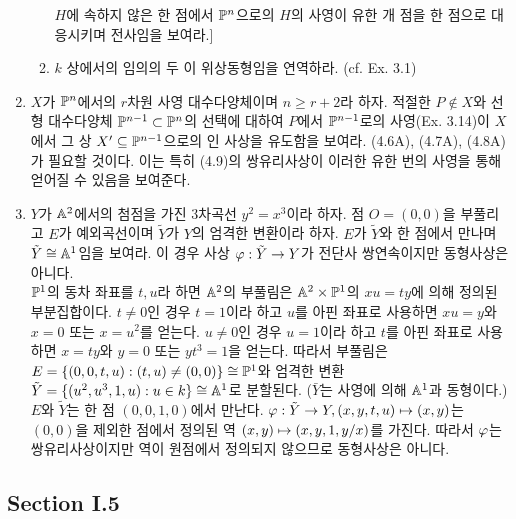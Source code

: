\begin{enumerate}[label=\tb{4.\arabic*.},itemindent=0mm,itemsep=4mm]
\begin{enumerate}[label=(\alph*)]
	$H$에 속하지 않은 한 점에서 $\mathbb{P}^n$으로의 $H$의 사영이 유한 개 점을 한 점으로 대응시키며 전사임을 보여라.]
	\item $k$ 상에서의 임의의 두 이 위상동형임을 연역하라. (cf. Ex. 3.1)
	\end{enumerate}
	\item $X$가 $\mathbb{P}^n$에서의 $r$차원 사영 대수다양체이며 $n\ge r+2$라 하자.
	적절한 $P\notin X$와 선형 대수다양체 $\mathbb{P}^{n-1}\subset\mathbb{P}^n$의 선택에 대하여 $P$에서 $\mathbb{P}^{n-1}$로의 사영(Ex. 3.14)이
	$X$에서 그 상 $X'\subseteq\mathbb{P}^{n-1}$으로의 인 사상을 유도함을 보여라.
	(4.6A), (4.7A), (4.8A)가 필요할 것이다. 이는 특히 (4.9)의 쌍유리사상이 이러한 유한 번의 사영을 통해 얻어질 수 있음을 보여준다.
	\item $Y$가 $\mathbb{A}^2$에서의 첨점을 가진 3차곡선 $y^2=x^3$이라 하자.
	점 $O=(0,0)$을 부풀리고 $E$가 예외곡선이며 $\tilde Y$가 $Y$의 엄격한 변환이라 하자.
	$E$가 $\tilde Y$와 한 점에서 만나며 $\tilde Y\cong\mathbb{A}^1$임을 보여라.
	이 경우 사상 $\varphi:\tilde Y\rightarrow Y$가 전단사 쌍연속이지만 동형사상은 아니다.\\
	\sol $\mathbb{P}^1$의 동차 좌표를 $t,u$라 하면 $\mathbb{A}^2$의 부풀림은 $\mathbb{A}^2\times\mathbb{P}^1$의 $xu=ty$에 의해 정의된 부분집합이다.
	$t\ne 0$인 경우 $t=1$이라 하고 $u$를 아핀 좌표로 사용하면 $xu=y$와 $x=0$ 또는 $x=u^2$를 얻는다.
	$u\ne 0$인 경우 $u=1$이라 하고 $t$를 아핀 좌표로 사용하면 $x=ty$와 $y=0$ 또는 $yt^3=1$을 얻는다.
	따라서 부풀림은 $E=\{(0,0,t,u):(t,u)\ne(0,0)\}\cong\mathbb{P}^1$와
	엄격한 변환 $\tilde Y=\{(u^2,u^3,1,u):u\in k\}\cong\mathbb{A}^1$로 분할된다. ($\bar Y$는 사영에 의해 $\mathbb{A}^1$과 동형이다.)
	$E$와 $\tilde Y$는 한 점 $(0,0,1,0)$에서 만난다.
	$\varphi:\tilde Y\rightarrow Y,(x,y,t,u)\mapsto(x,y)$는 $(0,0)$을 제외한 점에서 정의된 역 $(x,y)\mapsto(x,y,1,y/x)$를 가진다.
	따라서 $\varphi$는 쌍유리사상이지만 역이 원점에서 정의되지 않으므로 동형사상은 아니다.
	\end{enumerate}
	
	
	
	\subsection*{Section I.5}
	
